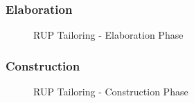 \documentclass[12pt]{article} %
\begin{document}
	\newpage
	
	\subsubsection{Elaboration}
	
	\begin{figure}[H] %
		\caption{RUP Tailoring - Elaboration Phase}
		\label{fig:speciation}
	\end{figure}
	
	\newpage
	
	\subsubsection{Construction}
	
		\begin{figure}[H] %
			\caption{RUP Tailoring - Construction Phase}
			\label{fig:speciation}
		\end{figure}
		
\end{document}
